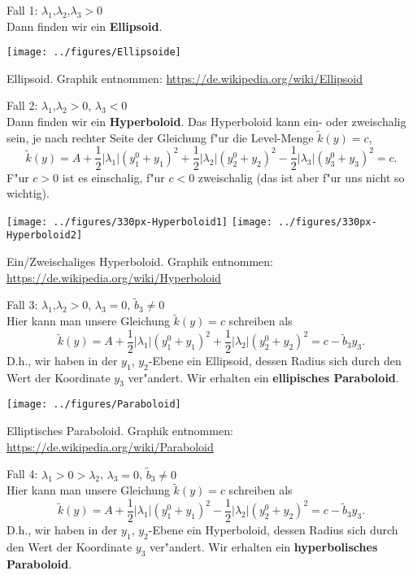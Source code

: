 Fall 1: $\lambda_1$,$\lambda_2$,$\lambda_3>0$\\
Dann finden wir ein {\bf Ellipsoid}.\par\medskip
\begin{center}
	\texttt{[image: ../figures/Ellipsoide]}
\end{center}
{\tiny Ellipsoid. Graphik entnommen: \url{https://de.wikipedia.org/wiki/Ellipsoid}}\par\medskip


Fall 2: $\lambda_1$,$\lambda_2>0$, $\lambda_3<0$\\
Dann finden wir ein {\bf Hyperboloid}. Das Hyperboloid kann ein- oder zweischalig sein, 
je nach rechter Seite der Gleichung f"ur die Level-Menge $\tilde k(y)=c$, 
$$ \tilde k(y) = A + \frac 1 2 |\lambda_1| (y_1^0+y_1)^2+\frac 1 2  |\lambda_2| (y_2^0+y_2)^2 - \frac 1 2 |\lambda_3| (y_3^0+y_3)^2 = c. $$
 F"ur $c>0$ ist es einschalig, f"ur $c<0$ zweischalig (das ist aber f"ur uns nicht so wichtig).\par\medskip
\begin{center}
	\texttt{[image: ../figures/330px-Hyperboloid1]}
	\texttt{[image: ../figures/330px-Hyperboloid2]}
\end{center}
{\tiny  Ein/Zweischaliges Hyperboloid. Graphik entnommen: \url{https://de.wikipedia.org/wiki/Hyperboloid}}\par\medskip



Fall 3:  $\lambda_1$,$\lambda_2>0$, $\lambda_3=0$, $\tilde b_{3}\not = 0$\\
Hier kann man unsere Gleichung $\tilde k(y)=c$ schreiben als 
$$ \tilde k(y) = A + \frac 1 2 |\lambda_1| (y_1^0+y_1)^2+ \frac 1 2 |\lambda_2| (y_2^0+y_2)^2  = c-\tilde b_{3} y_{3}. $$
D.h., wir haben in der $y_{1}$, $y_{2}$-Ebene ein Ellipsoid, dessen Radius sich durch den Wert der
Koordinate $y_3$ ver"andert. Wir erhalten ein {\bf ellipisches Paraboloid}. \par\medskip
\begin{center}
	\texttt{[image: ../figures/Paraboloid]}
\end{center}
{\tiny Elliptisches Paraboloid. Graphik entnommen: \url{https://de.wikipedia.org/wiki/Paraboloid}}\par\medskip
{}
Fall 4:  $\lambda_1>0>\lambda_2$, $\lambda_3=0$, $\tilde b_{3}\not = 0$\\
Hier kann man unsere Gleichung $\tilde k(y)=c$ schreiben als 
$$ \tilde k(y) = A +\frac 1 2  |\lambda_1| (y_1^0+y_1)^2- \frac 1 2 |\lambda_2| (y_2^0+y_2)^2  = c-\tilde b_{3} y_{3}. $$
D.h., wir haben in der $y_{1}$, $y_{2}$-Ebene ein Hyperboloid, dessen Radius sich durch den Wert der
Koordinate $y_3$ ver"andert. Wir erhalten ein {\bf hyperbolisches Paraboloid}. \par\medskip

